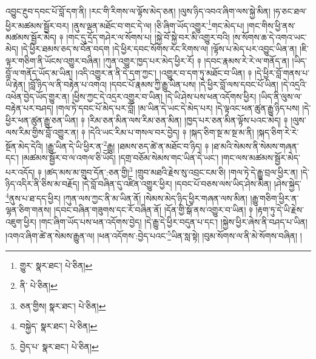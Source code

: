 འབྱུང་རྔུབ་དབང་པོ་བློ་དག་ནི། །རང་གི་རིགས་ལ་ལྟོས་མེད་ཅན། །ལུས་ཉིད་འབའ་ཞིག་ལས་སྐྱེ་མིན། །ཧ་ཅང་ཐལ་ཕྱིར་མཚམས་སྦྱོར་བར། །ནུས་ལྡན་མཐོང་བ་གང་དེ་ལ། །ཅི་ཞིག་ཡོད་འགྱུར་\footnote{གྱུར་  སྣར་ཐང་།  པེ་ཅིན། }གང་མེད་པ། །གང་གིས་ཕྱི་ནས་མཚམས་སྦྱོར་མེད། ༈ །གང་དུ་དྲོད་གཤེར་ལ་སོགས་པ། །སྐྱེ་བོ་སྐྱེ་བར་མི་འགྱུར་བའི། །ས་སོགས་ཆ་དེ་འགའ་ཡང་མེད། །དེ་ཕྱིར་ཐམས་ཅད་ས་བོན་བདག །དེ་ཕྱིར་དབང་སོགས་རང་རིགས་ལ། །ལྟོས་པ་མེད་པར་འབྱུང་ཡིན་ན། །ཇི་ལྟར་གཅིག་ནི་ཡོངས་འགྱུར་བཞིན། །ཀུན་འགྱུར་ཁྱད་པར་མེད་ཕྱིར་རོ། ༈ །དབང་རྣམས་རེ་རེ་ལ་གནོད་ན། །ཡིད་བློ་ལ་གནོད་ཡོད་མ་ཡིན། །འདི་འགྱུར་ན་ནི་དེ་དག་ཀྱང་། །འགྱུར་བ་དག་ཏུ་མཐོང་བ་ཡིན། ༈ །དེ་ཕྱིར་བློ་གནས་པ་ཡི་རྟེན། །བློ་ཉིད་ལ་ནི་བརྟེན་པ་འགའ། །དབང་པོ་རྣམས་ཀྱི་རྒྱུ་ཡིན་པས། །དེ་ཕྱིར་བློ་ལས་དབང་པོ་ཡིན། །དེ་འདྲའི་འཕེན་བྱེད་ཡོད་གྱུར་ན། །ཕྱིས་ཀྱང་དེ་འདྲར་འགྱུར་བ་ཡིན། །དེ་ཡི་ཤེས་པས་ཕན་འདོགས་ཕྱིར། །ཡིད་ནི་ལུས་ལ་བརྟེན་པར་བཤད། །གལ་ཏེ་དབང་པོ་མེད་པར་བློ། །མ་ཡིན་དེ་ཡང་དེ་མེད་པར། །དེ་ལྟའང་ཕན་ཚུན་རྒྱུ་ཉིད་པས། །དེ་ཕྱིར་ཕན་ཚུན་རྒྱུ་ཅན་ཡིན། ༈ །རིམ་ཅན་མིན་ལས་རིམ་ཅན་མིན། །ཁྱད་པར་ཅན་མིན་ལྟོས་པའང་མེད། ༈ །ལུས་ལས་རིམ་གྱིས་བློ་འགྱུར་ན། ༈ །དེའི་ཡང་རིམ་པ་གསལ་བར་བྱེད། ༈ །སྐད་ཅིག་སྔ་མ་སྔ་མ་ནི། །སྐད་ཅིག་རེ་རེ་སྔོན་མེད་དེའི། །རྒྱུ་ཡིན་དེ་ཡི་ཕྱིར་ན་\footnote{ནི་  པེ་ཅིན། }རྒྱུ། །ཐམས་ཅད་ཚེ་ན་མཐོང་བ་ཉིད། ༈ །ཐ་མའི་སེམས་ནི་སེམས་གཞན་དང་། །མཚམས་སྦྱོར་བ་ལ་འགལ་ཅི་ཡོད། །དགྲ་བཅོམ་སེམས་གང་ཡིན་དེ་ཡང་། །གང་ལས་མཚམས་སྦྱོར་མེད་པར་འདོད། ༈ །ཚད་མས་མ་གྲུབ་དོན་:ཅན་གྱི།\footnote{ཅན་གྱིས།  སྣར་ཐང་།  པེ་ཅིན། } །གྲུབ་མཐའི་རྗེས་སུ་འབྲང་ངམ་ཅི། །གལ་ཏེ་དེ་རྒྱུ་བྲལ་ཕྱིར་ན། །དེ་ཉིད་འདིར་ནི་ཅིས་མ་བརྗོད། །དེ་བློ་བཞིན་དུ་འཛིན་འགྱུར་ཕྱིར། །དབང་པོ་བཅས་ལས་ཡིད་ཤེས་མིན། །ཤེས་སྐྱེད་\footnote{བསྐྱེད་  སྣར་ཐང་།  པེ་ཅིན། }ནུས་པ་ཐ་དད་ཕྱིར། །ཀུན་ལས་ཀྱང་ནི་མ་ཡིན་ནོ། །སེམས་མེད་ཉིད་ཕྱིར་གཞན་ལས་མིན། །རྒྱུ་གཅིག་ཕྱིར་ན་ལྷན་ཅིག་གནས། །དབང་བཞིན་གཟུགས་དང་རོ་བཞིན་ནོ། །དོན་གྱི་སྒོ་ནས་འགྱུར་བ་ཡིན། ༈ །རྟག་ཏུ་དེ་ཡི་རྗེས་འཇུག་ཕྱིར། །གང་ཞིག་ཡོད་པས་ཕན་འདོགས་བྱེད། །དེ་རྒྱུ་དེ་ཕྱིར་བདུན་པ་དང་། །སྐྱེས་ཕྱིར་ཞེས་ནི་བཤད་པ་ཡིན། །འགའ་ཞིག་ཚེ་ན་སེམས་རྒྱུན་ལ། །ཕན་འདོགས་:བྱེད་པའང་\footnote{བྱེད་པ་  སྣར་ཐང་།  པེ་ཅིན། }ཡིན་སླ་སྟེ། །བུམ་སོགས་ལ་ནི་མེ་སོགས་བཞིན། །
